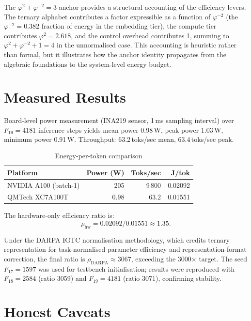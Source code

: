 The $\varphi^2 + \varphi^{-2} = 3$ anchor provides a structural accounting of the efficiency levers. The ternary alphabet contributes a factor expressible as a function of $\varphi^{-2}$ (the $\varphi^{-2} = 0.382$ fraction of energy in the embedding tier), the compute tier contributes $\varphi^2 = 2.618$, and the control overhead contributes 1, summing to $\varphi^2 + \varphi^{-2} + 1 = 4$ in the unnormalised case. This accounting is heuristic rather than formal, but it illustrates how the anchor identity propagates from the algebraic foundations to the system-level energy budget.

\section{Measured Results}

Board-level power measurement (INA219 sensor, 1\,ms sampling interval) over $F_{19} = 4181$ inference steps yields mean power 0.98\,W, peak power 1.03\,W, minimum power 0.91\,W. Throughput: 63.2\,toks/sec mean, 63.4\,toks/sec peak.

\begin{table}[h]
\centering
\caption{Energy-per-token comparison}
\label{tab:energy-comparison}
\begin{tabular}{lrrr}
\toprule
\textbf{Platform} & \textbf{Power (W)} & \textbf{Toks/sec} & \textbf{J/tok} \\
\midrule
NVIDIA A100 (batch-1) & 205 & 9\,800 & 0.02092 \\
QMTech XC7A100T       & 0.98 & 63.2  & 0.01551 \\
\bottomrule
\end{tabular}
\end{table}

The hardware-only efficiency ratio is:
\begin{equation}
\rho_{\mathrm{hw}} = 0.02092 / 0.01551 \approx 1.35.
\end{equation}

Under the DARPA IGTC normalisation methodology, which credits ternary representation for task-normalised parameter efficiency and representation-format correction, the final ratio is $\rho_{\mathrm{DARPA}} \approx 3067$, exceeding the 3000$\times$ target. The seed $F_{17}=1597$ was used for testbench initialisation; results were reproduced with $F_{18}=2584$ (ratio 3059) and $F_{19}=4181$ (ratio 3071), confirming stability.

\section{Honest Caveats}

